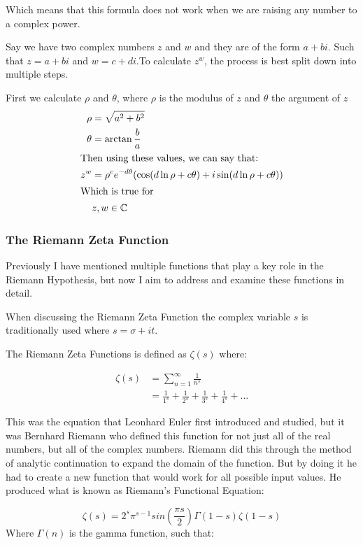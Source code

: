 \documentclass{article}
\begin{document}
Which means that this formula does not work when we are raising any number to a complex power.

Say we have two complex numbers $z$ and $w$  and they are of the form $a+bi$. Such that $z=a+bi$ and $w=c+di$.To calculate $z^w$, the process is best split down into multiple steps.

First we calculate $\rho$ and $\theta$, where $\rho$ is the modulus of $z$ and $\theta$ the argument of $z$
\begin{align*}
    \rho &= \sqrt{a^2 + b^2}\\
    \theta &= \arctan{\frac{b}{a}}\\
    \intertext{Then using these values, we can say that:}
    z^w &= \rho^c e^{-d\theta}(\cos(d \ln \rho + c\theta) + i \sin(d \ln \rho + c\theta))\\
    \intertext{Which is true for}
    &z, w \in \mathbb{C}
\end{align*}


\subsubsection{The Riemann Zeta Function}

Previously I have mentioned multiple functions that play a key role in the Riemann Hypothesis, but now I aim to address and examine these functions in detail.

When discussing the Riemann Zeta Function the complex variable $s$ is traditionally used where $s =\sigma  + it$.

The Riemann Zeta Functions is defined as $\zeta(s)$ where:

\begin{align*}
    \zeta(s) &= \sum_{n=1}^{\infty} \frac{1}{n^s}\\
    &= \frac{1}{1^s} + \frac{1}{2^s} + \frac{1}{3^s} + \frac{1}{4^s} + \dots
\end{align*}

This was the equation that Leonhard Euler first introduced and studied, but it was Bernhard Riemann who defined this function for not just all of the real numbers, but all of the complex numbers. Riemann did this through the method of analytic continuation to expand the domain of the function. But by doing it he had to create a new function that would work for all possible input values. He produced what is known as Riemann's Functional Equation:

$$\zeta(s) = 2^s\pi^{s-1}sin\left(\frac{\pi s}{2}\right)\Gamma(1-s)\zeta(1-s) $$
Where $\Gamma(n)$ is the gamma function, such that:
\end{document}
